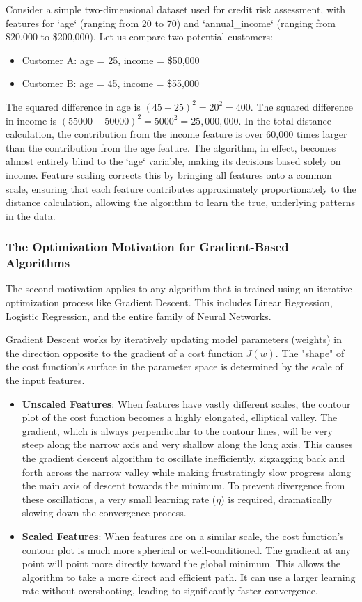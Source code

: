 \begin{itemize}
Consider a simple two-dimensional dataset used for credit risk assessment, with features for `age` (ranging from 20 to 70) and `annual_income` (ranging from \$20,000 to \$200,000). Let us compare two potential customers:
\begin{itemize}
    \item Customer A: age = 25, income = \$50,000
    \item Customer B: age = 45, income = \$55,000
\end{itemize}
The squared difference in age is $(45 - 25)^2 = 20^2 = 400$. The squared difference in income is $(55000 - 50000)^2 = 5000^2 = 25,000,000$. In the total distance calculation, the contribution from the income feature is over 60,000 times larger than the contribution from the age feature. The algorithm, in effect, becomes almost entirely blind to the `age` variable, making its decisions based solely on income. Feature scaling corrects this by bringing all features onto a common scale, ensuring that each feature contributes approximately proportionately to the distance calculation, allowing the algorithm to learn the true, underlying patterns in the data.

\subsubsection*{The Optimization Motivation for Gradient-Based Algorithms}
The second motivation applies to any algorithm that is trained using an iterative optimization process like Gradient Descent. This includes Linear Regression, Logistic Regression, and the entire family of Neural Networks.

Gradient Descent works by iteratively updating model parameters (weights) in the direction opposite to the gradient of a cost function $J(w)$. The "shape" of the cost function's surface in the parameter space is determined by the scale of the input features.
\begin{itemize}
    \item \textbf{Unscaled Features}: When features have vastly different scales, the contour plot of the cost function becomes a highly elongated, elliptical valley. The gradient, which is always perpendicular to the contour lines, will be very steep along the narrow axis and very shallow along the long axis. This causes the gradient descent algorithm to oscillate inefficiently, zigzagging back and forth across the narrow valley while making frustratingly slow progress along the main axis of descent towards the minimum. To prevent divergence from these oscillations, a very small learning rate ($\eta$) is required, dramatically slowing down the convergence process.
    \item \textbf{Scaled Features}: When features are on a similar scale, the cost function's contour plot is much more spherical or well-conditioned. The gradient at any point will point more directly toward the global minimum. This allows the algorithm to take a more direct and efficient path. It can use a larger learning rate without overshooting, leading to significantly faster convergence.
\end{itemize}


\end{itemize}
